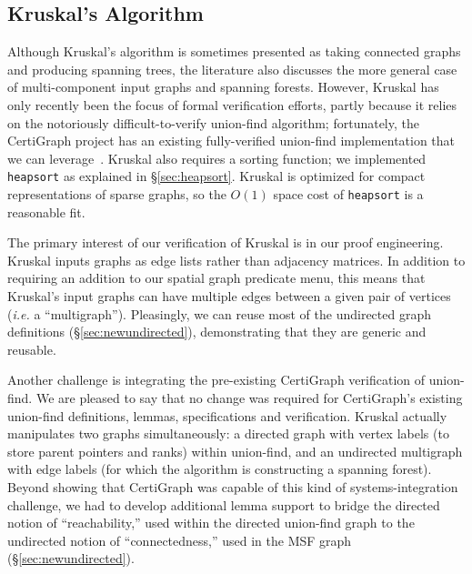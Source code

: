 \subsection{Kruskal's Algorithm}
\label{sec:kruskal}

Although Kruskal's algorithm is sometimes presented as taking connected graphs and producing spanning trees, the literature also discusses the more general case of multi-component input graphs and spanning forests.  However, Kruskal has only recently been the focus of formal verification efforts, partly because it relies on the notoriously difficult-to-verify union-find algorithm; fortunately, the CertiGraph project has an existing fully-verified union-find implementation that we can leverage~\cite{DBLP:journals/pacmpl/WangCMH19}.  Kruskal also requires a sorting function; we implemented \texttt{heapsort} as explained in \S\ref{sec:heapsort}.  Kruskal is optimized for compact representations of sparse graphs, so the $O(1)$ space cost of \texttt{heapsort} is a reasonable fit.  %

The primary interest of our verification of Kruskal is in our proof engineering.  Kruskal inputs graphs as edge lists rather than adjacency matrices.  In addition to requiring an addition to our spatial graph predicate menu, this means that Kruskal's input graphs can have multiple edges between a given pair of vertices (\emph{i.e.} a ``multigraph'').  Pleasingly, we can reuse most of the undirected graph definitions (\S\ref{sec:newundirected}), demonstrating that they are generic and reusable.

Another challenge is integrating the pre-existing CertiGraph verification of union-find.  We are pleased to say that no change was required for CertiGraph's existing union-find definitions, lemmas, specifications and verification.  Kruskal actually manipulates two graphs simultaneously: a directed graph with vertex labels (to store parent pointers and ranks) within union-find, and an undirected multigraph with edge labels (for which the algorithm is constructing a spanning forest).  Beyond showing that CertiGraph was capable of this kind of systems-integration challenge, we had to develop additional lemma support to bridge the directed notion of ``reachability,'' used within the directed union-find graph to the undirected notion of ``connectedness,'' used in the MSF graph (\S\ref{sec:newundirected}).


